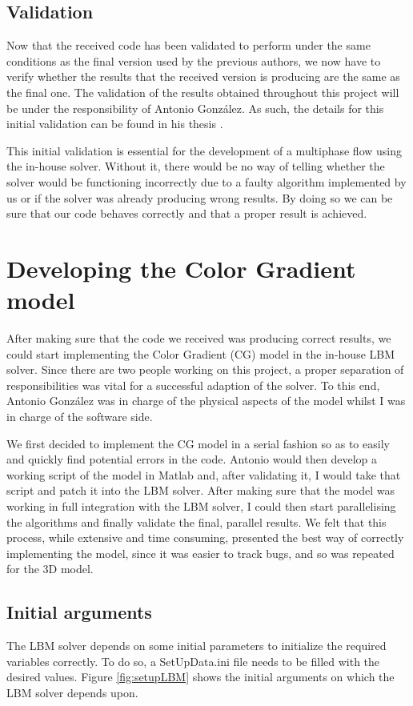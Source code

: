 \documentclass[12pt]{book}
\begin{document}
\subsection{Validation}
Now that the received code has been validated to perform under the same conditions as the final version used by the previous authors, we now have to verify whether the results that the received version is producing are the same as the final one. The validation of the results obtained throughout this project will be under the responsibility of Antonio González. As such, the details for this initial validation can be found in his thesis \cite{antonioThesis}.
\par This initial validation is essential for the development of a multiphase flow using the in-house solver. Without it, there would be no way of telling whether the solver would be functioning incorrectly due to a faulty algorithm implemented by us or if the solver was already producing wrong results. By doing so we can be sure that our code behaves correctly and that a proper result is achieved.

\section{Developing the Color Gradient model}
After making sure that the code we received was producing correct results, we could start implementing the Color Gradient (CG) model in the in-house LBM solver. Since there are two people working on this project, a proper separation of responsibilities  was vital for a successful adaption of the solver. To this end, Antonio González \cite{antonioThesis} was in charge of the physical aspects of the model whilst I was in charge of the software side. \par
We first decided to implement the CG model in a serial fashion so as to easily and quickly find potential errors in the code. Antonio would then develop a working script of the model in Matlab and, after validating it, I would take that script and patch it into the LBM solver. After making sure that the model was working in full integration with the LBM solver, I could then start parallelising the algorithms and finally validate the final, parallel results. We felt that this process, while extensive and time consuming, presented the best way of correctly implementing the model, since it was easier to track bugs, and so was repeated for the 3D model.
\subsection{Initial arguments}
The LBM solver depends on some initial parameters to initialize the required variables correctly. To do so, a SetUpData.ini file needs to be filled with the desired values. Figure \ref{fig:setupLBM} shows the initial arguments on which the LBM solver depends upon.
\end{document}
